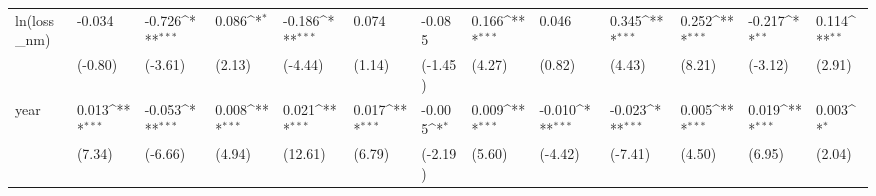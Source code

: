 \def\sym#1{\ifmmode^{#1}\else\(^{#1}\)\fi}
\begin{tabular}{p{1.5cm} p{1.7cm} p{1.7cm} p{1.7cm} p{1.7cm} p{1.7cm} p{1.7cm} p{1.7cm} p{1.7cm} p{1.7cm} p{1.7cm} p{1.7cm} p{1.7cm}}
\hline
ln(loss\_nm)     &   -0.034         &   -0.726\sym{***}&    0.086\sym{*}  &   -0.186\sym{***}&    0.074         &   -0.085         &    0.166\sym{***}&    0.046         &    0.345\sym{***}&    0.252\sym{***}&   -0.217\sym{**} &    0.114\sym{**} \\
                &  (-0.80)         &  (-3.61)         &   (2.13)         &  (-4.44)         &   (1.14)         &  (-1.45)         &   (4.27)         &   (0.82)         &   (4.43)         &   (8.21)         &  (-3.12)         &   (2.91)         \\
year            &    0.013\sym{***}&   -0.053\sym{***}&    0.008\sym{***}&    0.021\sym{***}&    0.017\sym{***}&   -0.005\sym{*}  &    0.009\sym{***}&   -0.010\sym{***}&   -0.023\sym{***}&    0.005\sym{***}&    0.019\sym{***}&    0.003\sym{*}  \\
                &   (7.34)         &  (-6.66)         &   (4.94)         &  (12.61)         &   (6.79)         &  (-2.19)         &   (5.60)         &  (-4.42)         &  (-7.41)         &   (4.50)         &   (6.95)         &   (2.04)         \\
\end{tabular}
